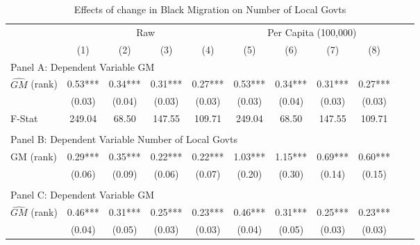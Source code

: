  \begin{table}[htbp]\centering {} \begin{threeparttable} \caption{Effects of change in Black Migration on Number of Local Govts} \begin{tabular}{l*{10}{c}} \toprule
                &\multicolumn{4}{c}{Raw}                                    &\multicolumn{4}{c}{Per Capita (100,000)}                   \\\cmidrule(lr){2-5}\cmidrule(lr){6-9}
                &\multicolumn{1}{c}{(1)}   &\multicolumn{1}{c}{(2)}   &\multicolumn{1}{c}{(3)}   &\multicolumn{1}{c}{(4)}   &\multicolumn{1}{c}{(5)}   &\multicolumn{1}{c}{(6)}   &\multicolumn{1}{c}{(7)}   &\multicolumn{1}{c}{(8)}   \\
\cmidrule(lr){1-9}
\multicolumn{8}{l}{Panel A: Dependent Variable GM}\\
\cmidrule(lr){1-9}
$\hat{GM}$ (rank)&       0.53***&       0.34***&       0.31***&       0.27***&       0.53***&       0.34***&       0.31***&       0.27***\\
                &     (0.03)   &     (0.04)   &     (0.03)   &     (0.03)   &     (0.03)   &     (0.04)   &     (0.03)   &     (0.03)   \\
\midrule
F-Stat          &     249.04   &      68.50   &     147.55   &     109.71   &     249.04   &      68.50   &     147.55   &     109.71   \\
\cmidrule[\heavyrulewidth](lr){1-9} \\ \cmidrule[\heavyrulewidth](lr){1-9}
\multicolumn{8}{l}{Panel B: Dependent Variable Number of Local Govts}\\
\cmidrule(lr){1-9}
GM  (rank)      &       0.29***&       0.35***&       0.22***&       0.22***&       1.03***&       1.15***&       0.69***&       0.60***\\
                &     (0.06)   &     (0.09)   &     (0.06)   &     (0.07)   &     (0.20)   &     (0.30)   &     (0.14)   &     (0.15)   \\
\cmidrule[\heavyrulewidth](lr){1-9} \\ \cmidrule[\heavyrulewidth](lr){1-9}
\multicolumn{8}{l}{Panel C: Dependent Variable GM}\\
\cmidrule(lr){1-9}
$\hat{GM}$ (rank)&       0.46***&       0.31***&       0.25***&       0.23***&       0.46***&       0.31***&       0.25***&       0.23***\\
                &     (0.04)   &     (0.05)   &     (0.03)   &     (0.03)   &     (0.04)   &     (0.05)   &     (0.03)   &     (0.03)   \\

\end{tabular}
\end{threeparttable}
\end{table}
